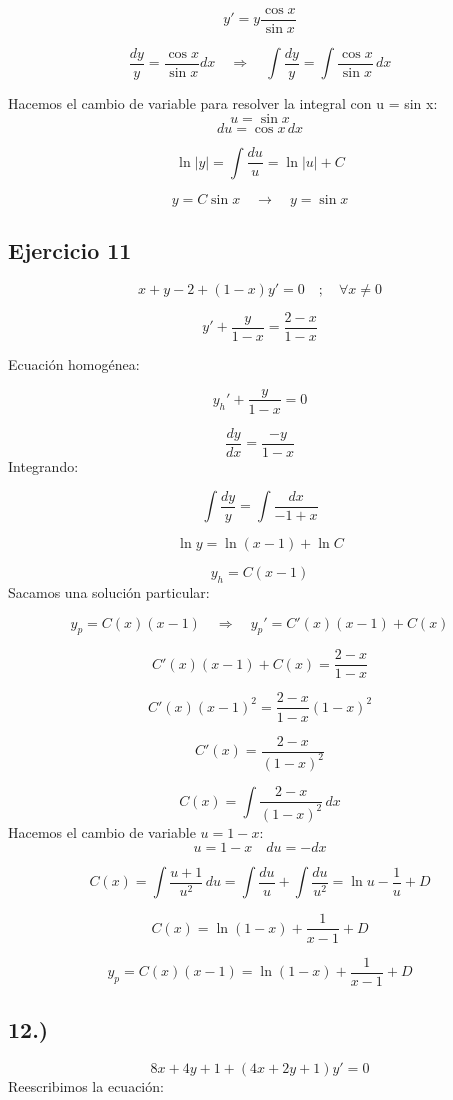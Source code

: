 \documentclass[a4paper,12pt]{article}
\begin{document}
\[
y' = y \frac{\cos x}{\sin x}
\]

\[
\frac{dy}{y} = \frac{\cos x}{\sin x}dx
\quad \Rightarrow \quad
\int \frac{dy}{y} = \int \frac{\cos x}{\sin x}\, dx
\]

\medskip
\noindent
Hacemos el cambio de variable para resolver la integral con u = sin x:
\[
u = \sin x
\]
\[
du = \cos x\, dx
\]

\[
\ln |y| = \int \frac{du}{u} = \ln |u| + C
\]

\[
y = C \sin x \quad \rightarrow \quad y = \sin x
\]

\subsection{Ejercicio 11}
\vspace{-1.2em}
\[
x + y - 2 + (1 - x) y' = 0 \quad ; \quad \forall x \neq 0
\]

\[
y' + \frac{y}{1 - x} = \frac{2 - x}{1 - x}
\]

Ecuación homogénea:

\[
y_h' + \frac{y}{1 - x} = 0
\]

\[
\frac{dy}{dx} = \frac{-y}{1 - x}
\]
\newpage
\noindent
Integrando:

\[
\int \frac{dy}{y} = \int \frac{dx}{-1 + x}
\]

\[
\ln y = \ln(x - 1) + \ln C
\]

\[
y_h = C (x - 1)
\]
Sacamos una solución particular:

\[
y_p = C(x)(x - 1) \quad \Rightarrow \quad y_p' = C'(x)(x - 1) + C(x)
\]

\[
C'(x)(x - 1) + C(x) = \frac{2 - x}{1 - x}
\]

\[
C'(x)(x - 1)^2 = \frac{2 - x}{1 - x} (1 - x)^2
\]

\[
C'(x) = \frac{2 - x}{(1 - x)^2}
\]

\[
C(x) = \int \frac{2 - x}{(1 - x)^2}\, dx
\]
Hacemos el cambio de variable \(u = 1 - x\):
\[
u = 1 - x \quad du = -dx
\]

\[
C(x) = \int \frac{u + 1}{u^2}\, du = \int \frac{du}{u} + \int \frac{du}{u^2} = \ln u - \frac{1}{u} + D
\]

\[
C(x) = \ln(1 - x) + \frac{1}{x - 1} + D
\]

\[
y_p = C(x)(x - 1) = \ln(1 - x) + \frac{1}{x - 1} + D
\]
\newpage
\noindent
\subsection*{12.)}
\[
8x + 4y + 1 + (4x + 2y + 1)y' = 0
\]
Reescribimos la ecuación:
\end{document}
